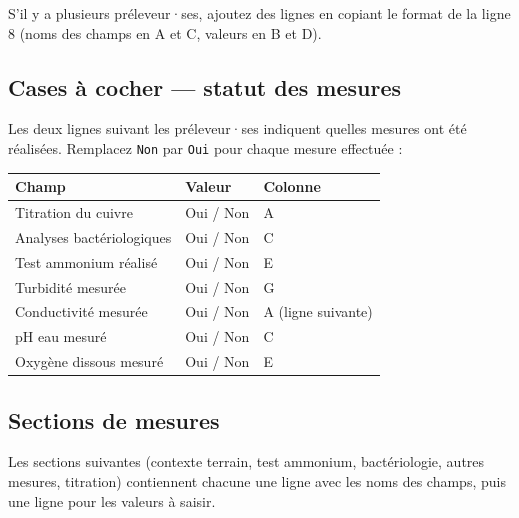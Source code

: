 \documentclass[12pt, a4paper]{article}
\begin{document}
\begin{conseil}
  S'il y a plusieurs préleveur·ses, ajoutez des lignes en copiant
  le format de la ligne 8 (noms des champs en A et C, valeurs en B et D).
\end{conseil}

\subsection{Cases à cocher — statut des mesures}

Les deux lignes suivant les préleveur·ses indiquent quelles mesures
ont été réalisées. Remplacez \texttt{Non} par \texttt{Oui} pour chaque
mesure effectuée :

\begin{center}
{\small
\begin{tabularx}{0.9\linewidth}{L{5cm} C{2cm} X}
  \toprule
  \textbf{Champ} & \textbf{Valeur} & \textbf{Colonne} \\
  \midrule
  Titration du cuivre & Oui / Non & A \\
  Analyses bactériologiques & Oui / Non & C \\
  Test ammonium réalisé & Oui / Non & E \\
  Turbidité mesurée & Oui / Non & G \\
  Conductivité mesurée & Oui / Non & A (ligne suivante) \\
  pH eau mesuré & Oui / Non & C \\
  Oxygène dissous mesuré & Oui / Non & E \\
  \bottomrule
\end{tabularx}
}
\end{center}

\subsection{Sections de mesures}

Les sections suivantes (contexte terrain, test ammonium, bactériologie,
autres mesures, titration) contiennent chacune une ligne avec les noms
des champs, puis une ligne pour les valeurs à saisir.
\end{document}

